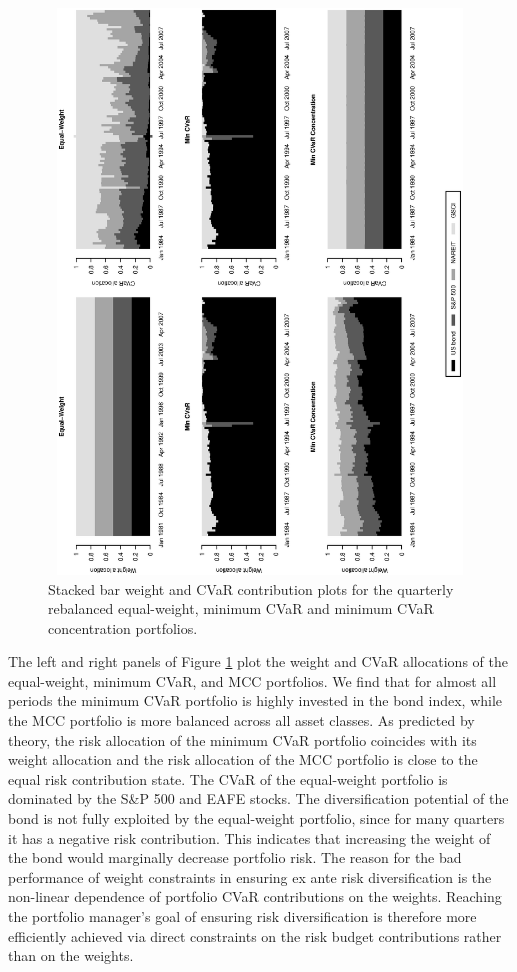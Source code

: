 \documentclass[12pt,a4paper]{article}
\begin{document}
\begin{figure}[tb]
\begin{center}
\caption{Stacked bar weight and CVaR contribution plots for the quarterly rebalanced equal-weight, minimum CVaR and minimum CVaR concentration portfolios. \label{fig:weightcvar_allocation_dynamic}} \vspace{-1cm}
\includegraphics[width=12cm,height=15cm,angle=270]{stackedweightsriskcont_benchmark_CC.eps}
\end{center}
\end{figure}

The left and right panels of Figure \ref{fig:weightcvar_allocation_dynamic} plot the weight and CVaR allocations of the equal-weight, minimum CVaR, and MCC portfolios. We find that for almost all periods the minimum CVaR portfolio is highly invested in the bond index, while the MCC portfolio is more balanced across all asset classes. As predicted by theory, the risk allocation of the minimum CVaR portfolio coincides with its weight allocation and the risk allocation of the MCC portfolio is close to the equal risk contribution state. The CVaR of the equal-weight portfolio is dominated by the S\&P 500 and EAFE stocks. The diversification potential of the bond is not fully exploited by the equal-weight portfolio, since for many quarters it has a negative risk contribution. This indicates that increasing the weight of the bond would marginally decrease portfolio risk.  The reason for the bad performance of weight constraints in ensuring ex ante risk diversification is the non-linear dependence of portfolio CVaR contributions on the weights. Reaching the portfolio manager's goal of ensuring risk diversification is therefore more efficiently achieved via direct constraints on the risk budget contributions rather than on the weights.
\end{document}
